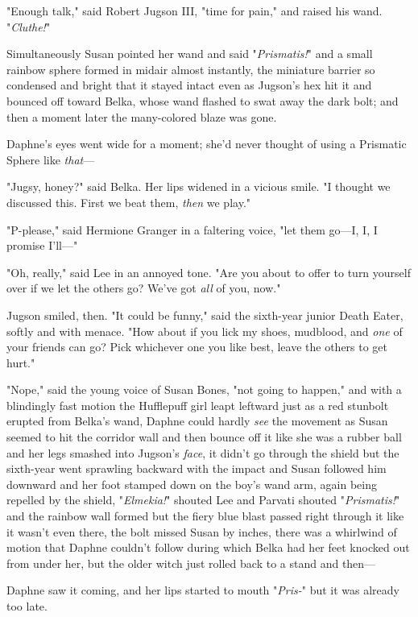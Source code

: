 "Enough talk," said Robert Jugson III, "time for pain," and raised his wand. 
"\emph{Cluthe!}"

Simultaneously Susan pointed her wand and said "\emph{Prismatis!}" and a small 
rainbow sphere formed in midair almost instantly, the miniature barrier so 
condensed and bright that it stayed intact even as Jugson's hex hit it and 
bounced off toward Belka, whose wand flashed to swat away the dark bolt; and 
then a moment later the many-colored blaze was gone.

Daphne's eyes went wide for a moment; she'd never thought of using a Prismatic 
Sphere like \emph{that}---

"Jugsy, honey?" said Belka. Her lips widened in a vicious smile. "I thought we 
discussed this. First we beat them, \emph{then} we play."

"P-please," said Hermione Granger in a faltering voice, "let them go---I, I, I 
promise I'll---"

"Oh, really," said Lee in an annoyed tone. "Are you about to offer to turn 
yourself over if we let the others go? We've got \emph{all} of you, now."

Jugson smiled, then. "It could be funny," said the sixth-year junior Death 
Eater, softly and with menace. "How about if you lick my shoes, mudblood, and 
\emph{one} of your friends can go? Pick whichever one you like best, leave the 
others to get hurt."

"Nope," said the young voice of Susan Bones, "not going to happen," and with a 
blindingly fast motion the Hufflepuff girl leapt leftward just as a red 
stunbolt erupted from Belka's wand, Daphne could hardly \emph{see} the movement 
as Susan seemed to hit the corridor wall and then bounce off it like she was a 
rubber ball and her legs smashed into Jugson's \emph{face}, it didn't go 
through the shield but the sixth-year went sprawling backward with the impact 
and Susan followed him downward and her foot stamped down on the boy's wand 
arm, again being repelled by the shield, "\emph{Elmekia!}" shouted Lee and 
Parvati shouted "\emph{Prismatis!}" and the rainbow wall formed but the fiery 
blue blast passed right through it like it wasn't even there, the bolt missed 
Susan by inches, there was a whirlwind of motion that Daphne couldn't follow 
during which Belka had her feet knocked out from under her, but the older witch 
just rolled back to a stand and then---

Daphne saw it coming, and her lips started to mouth "\emph{Pris-}" but it was 
already too late.

